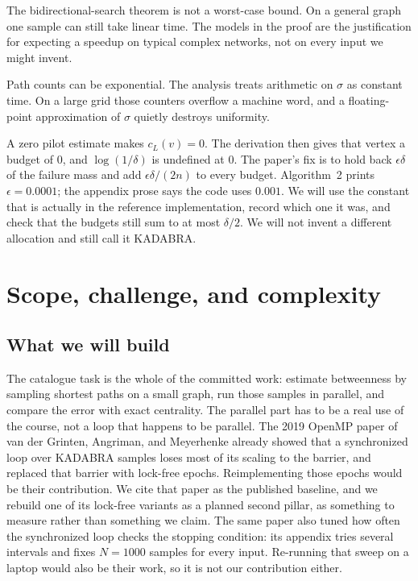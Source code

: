 \documentclass[11pt]{article}
\begin{document}
The bidirectional-search theorem is not a worst-case bound. On a general graph one sample can still take linear time. The models in the proof are the justification for expecting a speedup on typical complex networks, not on every input we might invent.

Path counts can be exponential. The analysis treats arithmetic on $\sigma$ as constant time. On a large grid those counters overflow a machine word, and a floating-point approximation of $\sigma$ quietly destroys uniformity.

A zero pilot estimate makes $c_L(v)=0$. The derivation then gives that vertex a budget of $0$, and $\log(1/\delta)$ is undefined at $0$. The paper's fix is to hold back $\epsilon\delta$ of the failure mass and add $\epsilon\delta/(2n)$ to every budget. Algorithm~2 prints $\epsilon=0.0001$; the appendix prose says the code uses $0.001$. We will use the constant that is actually in the reference implementation, record which one it was, and check that the budgets still sum to at most $\delta/2$. We will not invent a different allocation and still call it KADABRA.

\section{Scope, challenge, and complexity}

\subsection{What we will build}

The catalogue task is the whole of the committed work: estimate betweenness by sampling shortest paths on a small graph, run those samples in parallel, and compare the error with exact centrality. The parallel part has to be a real use of the course, not a loop that happens to be parallel. The 2019 OpenMP paper of van der Grinten, Angriman, and Meyerhenke already showed that a synchronized loop over KADABRA samples loses most of its scaling to the barrier, and replaced that barrier with lock-free epochs. Reimplementing those epochs would be their contribution. We cite that paper as the published baseline, and we rebuild one of its lock-free variants as a planned second pillar, as something to measure rather than something we claim. The same paper also tuned how often the synchronized loop checks the stopping condition: its appendix tries several intervals and fixes $N=1000$ samples for every input. Re-running that sweep on a laptop would also be their work, so it is not our contribution either.
\end{document}
